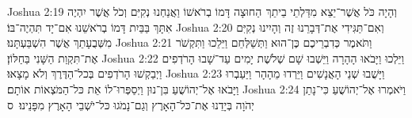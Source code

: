 Joshua 2:19	וְהָיָה כֹּל אֲשֶׁר־יֵצֵא מִדַּלְתֵי בֵיתֵךְ  הַחוּצָה דָּמוֹ בְרֹאשׁוֹ וַאֲנַחְנוּ נְקִיִּם וְכֹל אֲשֶׁר יִהְיֶה אִתָּךְ בַּבַּיִת דָּמוֹ בְרֹאשֵׁנוּ אִם־יָד תִּהְיֶה־בּוֹ׃
Joshua 2:20	וְאִם־תַּגִּידִי אֶת־דְּבָרֵנוּ זֶה וְהָיִינוּ נְקִיִּם מִשְּׁבֻעָתֵךְ אֲשֶׁר הִשְׁבַּעְתָּנוּ׃
Joshua 2:21	וַתֹּאמֶר כְּדִבְרֵיכֶם כֶּן־הוּא וַתְּשַׁלְּחֵם וַיֵּלֵכוּ וַתִּקְשֹׁר אֶת־תִּקְוַת הַשָּׁנִי בַּחַלּוֹן׃
Joshua 2:22	וַיֵּלְכוּ וַיָּבֹאוּ הָהָרָה וַיֵּשְׁבוּ שָׁם שְׁלֹשֶׁת יָמִים עַד־שָׁבוּ הָרֹדְפִים וַיְבַקְשׁוּ הָרֹדְפִים בְּכל־הַדֶּרֶךְ וְלֹא מָצָאוּ׃
Joshua 2:23	וַיָּשֻׁבוּ שְׁנֵי הָאֲנָשִׁים וַיֵּרְדוּ מֵהָהָר וַיַּעַבְרוּ וַיָּבֹאוּ אֶל־יְהוֹשֻׁעַ בִּן־נוּן וַיְסַפְּרוּ־לוֹ אֵת כּל־הַמֹּצְאוֹת אוֹתָם׃
Joshua 2:24	וַיֹּאמְרוּ אֶל־יְהוֹשֻׁעַ כִּי־נָתַן יְהֹוָה בְּיָדֵנוּ אֶת־כּל־הָאָרֶץ וְגַם־נָמֹגוּ כּל־יֹשְׁבֵי הָאָרֶץ מִפָּנֵינוּ׃ {ס}        
